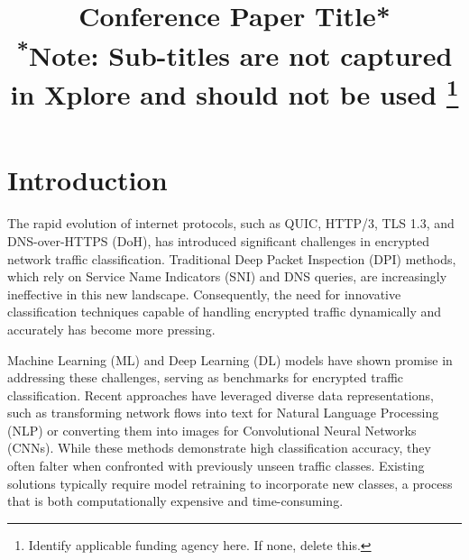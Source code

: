 \documentclass[conference]{IEEEtran}
\begin{document}
\title{Conference Paper Title*\\
{\footnotesize \textsuperscript{*}Note: Sub-titles are not captured in Xplore and
should not be used}
\thanks{Identify applicable funding agency here. If none, delete this.}
}

\author{
\and
{}
}

\maketitle

\begin{abstract}

\end{abstract}

\begin{IEEEkeywords}

\end{IEEEkeywords}

\section{Introduction}
The rapid evolution of internet protocols, such as QUIC, HTTP/3, TLS 1.3, and DNS-over-HTTPS (DoH), has introduced significant challenges in encrypted network traffic classification. Traditional Deep Packet Inspection (DPI) methods, which rely on Service Name Indicators (SNI) and DNS queries, are increasingly ineffective in this new landscape. Consequently, the need for innovative classification techniques capable of handling encrypted traffic dynamically and accurately has become more pressing.

Machine Learning (ML) and Deep Learning (DL) models have shown promise in addressing these challenges, serving as benchmarks for encrypted traffic classification. Recent approaches have leveraged diverse data representations, such as transforming network flows into text for Natural Language Processing (NLP) or converting them into images for Convolutional Neural Networks (CNNs). While these methods demonstrate high classification accuracy, they often falter when confronted with previously unseen traffic classes. Existing solutions typically require model retraining to incorporate new classes, a process that is both computationally expensive and time-consuming.
\end{document}
